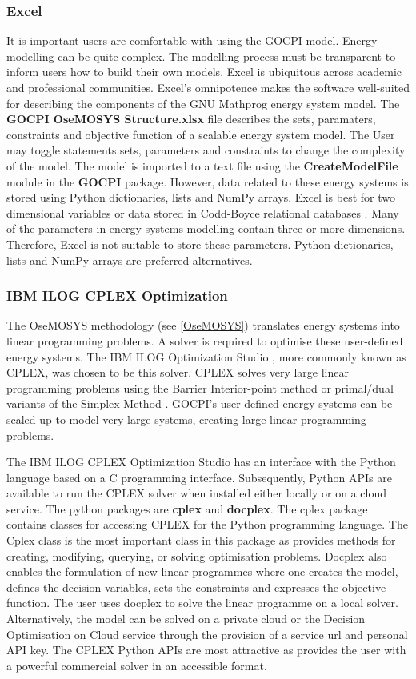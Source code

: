 \documentclass[12pt]{article}
\begin{document}
\subsubsection{Excel}
It is important users are comfortable with using the GOCPI model. 
Energy modelling can be quite complex. The modelling process must be transparent to inform users how to build their own models.
Excel is ubiquitous across academic and professional communities.
Excel's omnipotence makes the software well-suited for describing the components of the GNU Mathprog energy system model.
The \textbf{GOCPI OseMOSYS Structure.xlsx} file describes the sets, paramaters, constraints and objective function of a scalable energy system model.
The User may toggle statements sets, parameters and constraints to change the complexity of the model. 
The model is imported to a text file using the \textbf{CreateModelFile} module in the \textbf{GOCPI} package.
However, data related to these energy systems is stored using Python dictionaries, lists and NumPy arrays.
Excel is best for two dimensional variables or data stored in Codd-Boyce relational databases \cite{CBNF}.
Many of the parameters in energy systems modelling contain three or more dimensions. 
Therefore, Excel is not suitable to store these parameters.
Python dictionaries, lists and NumPy arrays are preferred alternatives.

\subsubsection{IBM ILOG CPLEX Optimization}
The OseMOSYS methodology (see \ref{OseMOSYS}) translates energy systems into linear programming problems. A solver is required to optimise these user-defined energy systems.
The IBM ILOG Optimization Studio \cite{IBM_ILOG}, more commonly known as CPLEX, was chosen to be this solver.
CPLEX solves very large linear programming problems using the Barrier Interior-point method \cite{IPM} or primal/dual variants of the Simplex Method \cite{Simplex}.
GOCPI's user-defined energy systems can be scaled up to model very large systems, creating large linear programming problems.

The IBM ILOG CPLEX Optimization Studio has an interface with the Python language based on a C programming interface.
Subsequently, Python APIs are available to run the CPLEX solver when installed either locally or on a cloud service.
The python packages are \textbf{cplex} and \textbf{docplex}. The cplex package contains classes for accessing CPLEX for the Python programming language. 
The Cplex class is the most important class in this package as provides methods for creating, modifying, querying, or solving optimisation problems.
Docplex also enables the formulation of new linear programmes where one creates the model, defines the decision variables, sets the constraints and expresses the objective function.
The user uses docplex to solve the linear programme on a local solver. 
Alternatively, the model can be solved on a private cloud or the Decision Optimisation on Cloud service through the provision of a service url and personal API key.
The CPLEX Python APIs are most attractive as provides the user with a powerful commercial solver in an accessible format.
\end{document}
